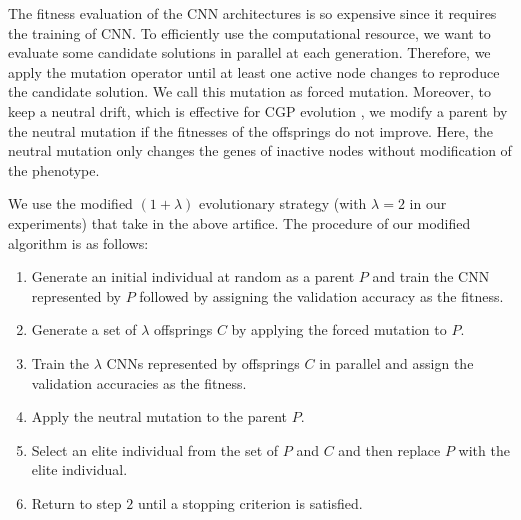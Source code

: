 The fitness evaluation of the CNN architectures is so expensive since it requires the training of CNN.
To efficiently use the computational resource, we want to evaluate some candidate solutions in parallel at each generation.
Therefore, we apply the mutation operator until at least one active node changes to reproduce the candidate solution. We call this mutation as forced mutation.
Moreover, to keep a neutral drift, which is effective for CGP evolution , we modify a parent by the neutral mutation if the fitnesses of the offsprings do not improve.
Here, the neutral mutation only changes the genes of inactive nodes without modification of the phenotype.

We use the modified $(1+\lambda)$ evolutionary strategy (with $\lambda = 2$ in our experiments) that take in the above artifice.
The procedure of our modified algorithm is as follows:
\begin{enumerate}
  \item Generate an initial individual at random as a parent $P$ and train the CNN represented by $P$ followed by assigning the validation accuracy as the fitness.
  \item Generate a set of $\lambda$ offsprings $C$ by applying the forced mutation to $P$.
  \item Train the $\lambda$ CNNs represented by offsprings $C$ in parallel and assign the validation accuracies as the fitness.
  \item Apply the neutral mutation to the parent $P$.
  \item Select an elite individual from the set of $P$ and $C$ and then replace $P$ with the elite individual.
  \item Return to step $2$ until a stopping criterion is satisfied.
\end{enumerate}

